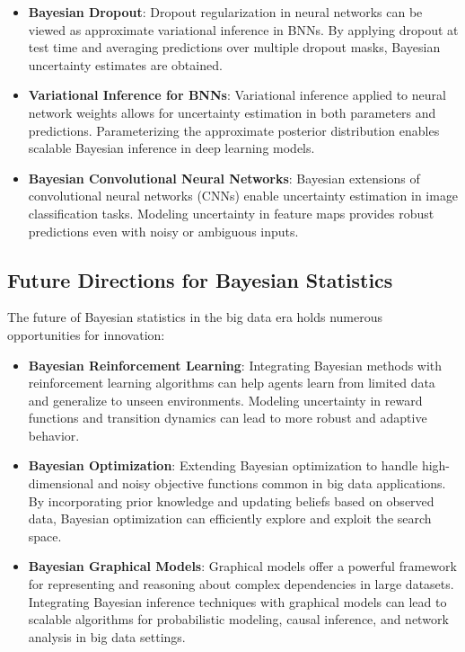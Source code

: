 \documentclass[12pt]{book} %
\begin{document}
\begin{itemize}
    \item \textbf{Bayesian Dropout}: Dropout regularization in neural networks can be viewed as approximate variational inference in BNNs. By applying dropout at test time and averaging predictions over multiple dropout masks, Bayesian uncertainty estimates are obtained.
    
    \item \textbf{Variational Inference for BNNs}: Variational inference applied to neural network weights allows for uncertainty estimation in both parameters and predictions. Parameterizing the approximate posterior distribution enables scalable Bayesian inference in deep learning models.
    
    \item \textbf{Bayesian Convolutional Neural Networks}: Bayesian extensions of convolutional neural networks (CNNs) enable uncertainty estimation in image classification tasks. Modeling uncertainty in feature maps provides robust predictions even with noisy or ambiguous inputs.
\end{itemize}

\subsection{Future Directions for Bayesian Statistics}
The future of Bayesian statistics in the big data era holds numerous opportunities for innovation:

\begin{itemize}
    \item \textbf{Bayesian Reinforcement Learning}: Integrating Bayesian methods with reinforcement learning algorithms can help agents learn from limited data and generalize to unseen environments. Modeling uncertainty in reward functions and transition dynamics can lead to more robust and adaptive behavior.
    
    \item \textbf{Bayesian Optimization}: Extending Bayesian optimization to handle high-dimensional and noisy objective functions common in big data applications. By incorporating prior knowledge and updating beliefs based on observed data, Bayesian optimization can efficiently explore and exploit the search space.
    
    \item \textbf{Bayesian Graphical Models}: Graphical models offer a powerful framework for representing and reasoning about complex dependencies in large datasets. Integrating Bayesian inference techniques with graphical models can lead to scalable algorithms for probabilistic modeling, causal inference, and network analysis in big data settings.
\end{itemize}
\end{document}

